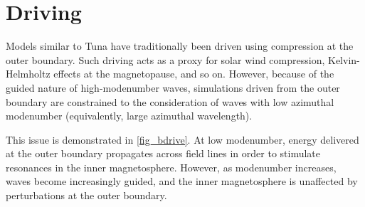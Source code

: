 \section{Driving}
  \label{sec_driving}


Models similar to Tuna have traditionally been driven using compression at the
outer boundary\cite{lysak_2004,lysak_2013,waters_2013,waters_2008}. Such
driving acts as a proxy for solar wind compression, Kelvin-Helmholtz effects at
the magnetopause, and so on. However, because of the guided nature of
high-modenumber \Alfven waves, simulations driven from the outer boundary are
constrained to the consideration of waves with low azimuthal modenumber
(equivalently, large azimuthal wavelength). 

This issue is demonstrated in \cref{fig_bdrive}. At low modenumber, energy
delivered at the outer boundary propagates across field lines in order to
stimulate resonances in the inner magnetosphere. However, as modenumber
increases, \Alfven waves become increasingly guided, and the inner
magnetosphere is unaffected by perturbations at the outer boundary. 

